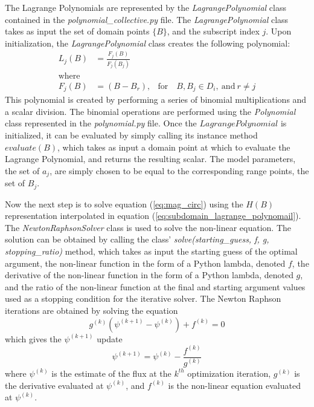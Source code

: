 \documentclass[11pt]{article}
\begin{document}
The Lagrange Polynomials are represented by the \textit{LagrangePolynomial} class contained in the \textit{polynomial\_collective.py} file. The \textit{LagrangePolynomial} class takes as input the set of domain points $\{B\}$, and the subscript index $j$. Upon initialization, the \textit{LagrangePolynomial} class creates the following polynomial:
\begin{align*}
L_j(B) &= \frac{F_j(B)}{F_j(B_j)}\\
\text{where}\\
F_j(B) &= (B - B_r), &\text{for} \quad B, B_j \in D_i, \ \text{and}\ r \neq j
\end{align*}
This polynomial is created by performing a series of binomial multiplications and a scalar division. The binomial operations are performed using the \textit{Polynomial} class represented in the \textit{polynomial.py} file. Once the $LagrangePolynomial$ is initialized, it can be evaluated by simply calling its instance method $evaluate(B)$, which takes as input a domain point at which to evaluate the Lagrange Polynomial, and returns the resulting scalar. The model parameters, the set of $a_j$, are simply chosen to be equal to the corresponding range points, the set of $B_j$.

Now the next step is to solve equation (\ref{eq:mag_circ}) using the $H(B)$ representation interpolated in equation (\ref{eq:subdomain_lagrange_polynomail}). The \textit{NewtonRaphsonSolver} class is used to solve the non-linear equation. The solution can be obtained by calling the class' \textit{solve(starting\_guess, f, g, stopping\_ratio)} method, which takes as input the starting guess of the optimal argument, the non-linear function in the form of a Python lambda, denoted $f$, the derivative of the non-linear function in the form of a Python lambda, denoted $g$, and the ratio of the non-linear function at the final and starting argument values used as a stopping condition for the iterative solver. The Newton Raphson iterations are obtained by solving the equation
$$g^{(k)} (\psi^{(k+1)} - \psi^{(k)}) + f^{(k)} = 0$$
which gives the $\psi^{(k+1)}$ update
$$\boxed{\psi^{(k+1)} = \psi^{(k)} - \frac{f^{(k)}}{g^{(k)}}}$$
where $\psi^{(k)}$ is the estimate of the flux at the $k^{th}$ optimization iteration, $g^{(k)}$ is the derivative evaluated at $\psi^{(k)}$, and $f^{(k)}$ is the non-linear equation evaluated at $\psi^{(k)}$.
\end{document}
